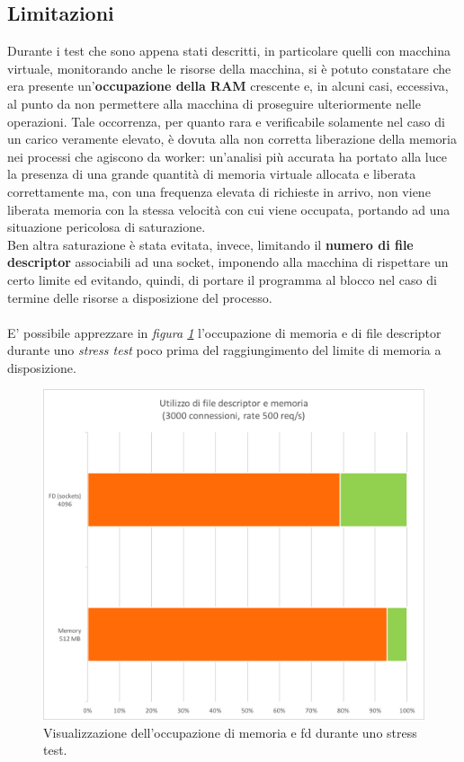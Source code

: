 \documentclass[italian]{tktltiki2}
\begin{document}
\subsection{Limitazioni}
Durante i test che sono appena stati descritti, in particolare quelli con macchina virtuale, monitorando anche le risorse della macchina, si è potuto constatare che era presente un'\textbf{occupazione della RAM} crescente e, in alcuni casi, eccessiva, al punto da non permettere alla macchina di proseguire ulteriormente nelle operazioni. Tale occorrenza, per quanto rara e verificabile solamente nel caso di un carico veramente elevato, è dovuta alla non corretta liberazione della memoria nei processi che agiscono da worker: un'analisi più accurata ha portato alla luce la presenza di una grande quantità di memoria virtuale allocata e liberata correttamente ma, con una frequenza elevata di richieste in arrivo, non viene liberata memoria con la stessa velocità con cui viene occupata, portando ad una situazione pericolosa di saturazione. \\
Ben altra saturazione è stata evitata, invece, limitando il \textbf{numero di file descriptor} associabili ad una socket, imponendo alla macchina di rispettare un certo limite ed evitando, quindi, di portare il programma al blocco nel caso di termine delle risorse a disposizione del processo. \\\\
E' possibile apprezzare in \emph{figura \ref{fig: fd_memory}} l'occupazione di memoria e di file descriptor durante uno \emph{stress test} poco prima del raggiungimento del limite di memoria a disposizione. 
\begin{figure}[H]
\centering
\includegraphics[width=\textwidth]{images/fd_memory}
\caption{Visualizzazione dell'occupazione di memoria e fd durante uno stress test.\label{fig: fd_memory}}
\end{figure}
\end{document}
